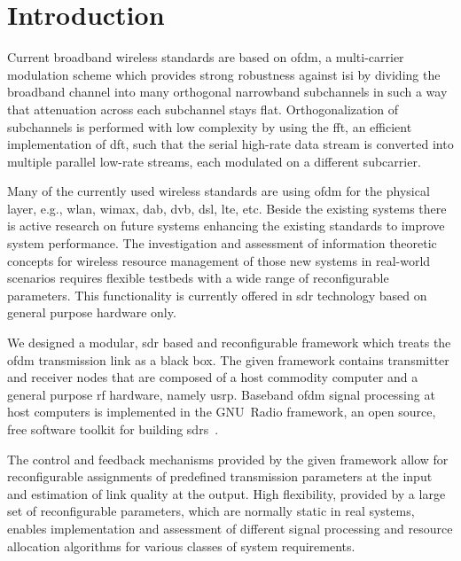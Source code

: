 \chapter{Introduction}

Current broadband wireless standards are based on \gls{ofdm}, a multi-carrier modulation scheme which provides strong robustness against \gls{isi} by dividing the broadband channel into many orthogonal narrowband subchannels in such a way that attenuation across each subchannel stays flat. Orthogonalization of subchannels is performed with low complexity by using the \gls{fft}, an efficient implementation of \gls{dft}, such that the serial high-rate data stream is converted into multiple parallel low-rate streams, each modulated on a different subcarrier.

Many of the currently used wireless standards are using \gls{ofdm} for the physical layer, e.g., \gls{wlan}, \gls{wimax}, \gls{dab}, \gls{dvb}, \gls{dsl}, \gls{lte}, etc. Beside the existing systems there is active research on future systems enhancing the existing standards to improve system performance. The investigation and assessment of information theoretic concepts for wireless resource management of those new systems in real-world scenarios requires flexible testbeds with a wide range of reconfigurable parameters. This functionality is currently offered in \gls{sdr} technology based on general purpose hardware only.

We designed a modular, \gls{sdr} based and reconfigurable framework which treats the \gls{ofdm} transmission link as a black box. The given framework contains transmitter and receiver nodes that are composed of a host commodity computer and a general purpose \gls{rf} hardware, namely \gls{usrp}. Baseband \gls{ofdm} signal processing at host computers is implemented in the GNU~Radio framework, an open source, free software toolkit for building \glspl{sdr}~\cite{GNUR}.

The control and feedback mechanisms provided by the given framework allow for reconfigurable assignments of predefined transmission parameters at the input and estimation of link quality at the output. High flexibility, provided by a large set of reconfigurable parameters, which are normally static in real systems, enables implementation and assessment of different signal processing and resource allocation algorithms for various classes of system requirements.

